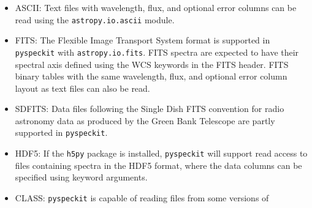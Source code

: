 \documentclass[twocolumn]{aastex63}
\newcommand{\pyspeckit}{\texttt{pyspeckit}\xspace}
\begin{document}
\begin{itemize}
    \item ASCII: Text files with wavelength, flux, and optional error
        columns can be read using the \texttt{astropy.io.ascii} module.
    \item FITS: The Flexible Image Transport System \citep[FITS;][]{Wells1981a,Greisen2006a,Pence2010a} format is
	supported in \pyspeckit with \texttt{astropy.io.fits}.  
    FITS spectra are expected to have their spectral axis defined using the WCS
    keywords in the FITS header.  FITS binary tables with the same
    wavelength, flux, and optional error column layout as text files
    can also be read.
    \item SDFITS: Data files following the Single
	Dish FITS \citep[SDFITS;][]{Garwood2000a} convention for radio astronomy data as
	produced by the Green Bank Telescope are partly supported in \pyspeckit.
    \item HDF5: 
        If the \texttt{h5py} package is installed, \pyspeckit will support read
        access to files containing spectra in the HDF5 format, where the data
        columns can be specified using keyword arguments.
    \item CLASS: \pyspeckit is capable of reading files from some versions of

\end{itemize}
\end{document}
